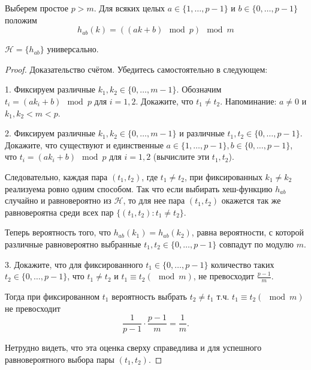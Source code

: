 Выберем простое $p > m$. Для всяких целых $a \in \{1, \ldots, p-1\}$ и $b \in \{0, \ldots, p-1\}$ положим $$h_{ab}(k) = ((ak+b)\mod p) \mod m$$
\begin{theorem*}
	$\mathcal{H} = \{h_{ab}\}$  универсально.
\end{theorem*}
\begin{proof}
Доказательство счётом. Убедитесь самостоятельно в следующем:

1. Фиксируем различные $k_1, k_2 \in \{0, \ldots, m-1\}$. Обозначим $t_i = (ak_i + b)\mod p$ для $i = 1,2$. Докажите, что $t_1 \neq t_2$. Напоминание: $a\neq 0$ и $k_1, k_2 < m < p$.

2. Фиксируем различные $k_1, k_2 \in \{0, \ldots, m-1\}$ и различные $t_1, t_2 \in \{0, \ldots, p-1\}$. Докажите, что существуют и единственные $a \in \{1, \ldots, p-1\}, b \in \{0, \ldots, p-1\}$, что $t_i = (ak_i+b)\mod p$ для $i=1,2$ (вычислите эти $t_1, t_2$).

Следовательно, каждая пара $(t_1, t_2)$, где $t_1 \neq t_2$, при фиксированных $k_1 \neq k_2$ реализуема ровно одним способом. Так что если выбирать хеш-функцию $h_{ab}$ случайно и равновероятно из $\mathcal{H}$, то для нее пара $(t_1, t_2)$ окажется так же равновероятна среди всех пар $\{(t_1, t_2) \colon t_1 \neq t_2\}$.

Теперь вероятность того, что $h_{ab}(k_1) = h_{ab}(k_2)$, равна вероятности, с которой различные равновероятно выбранные $t_1, t_2 \in \{0, \ldots, p-1\}$ совпадут по модулю $m$.

3. Докажите, что для фиксированного $t_1 \in \{0, \ldots, p-1\}$ количество таких $t_2 \in \{0, \ldots, p-1\}$, что $t_1 \neq t_2$ и $t_1 \equiv t_2 (\mod m)$, не превосходит $\frac{p-1}{m}$.

Тогда при фиксированном $t_1$ вероятность выбрать $t_2 \neq t_1$ т.ч. $t_1\equiv t_2 (\mod m)$ не превосходит $$\frac{1}{p-1} \cdot \frac{p-1}{m} = \frac{1}{m}.$$

Нетрудно видеть, что эта оценка сверху справедлива и для успешного равновероятного выбора пары $(t_1, t_2)$.
\end{proof}



